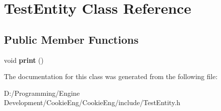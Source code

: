 \hypertarget{class_test_entity}{}\section{Test\+Entity Class Reference}
\label{class_test_entity}
\subsection*{Public Member Functions}
\begin{DoxyCompactItemize}
\item 
\mbox{\label{class_test_entity_a3b92d1c3a43cbd536b7ae817b2155c9c}} 
void {\bfseries print} ()
\end{DoxyCompactItemize}


The documentation for this class was generated from the following file\+:\begin{DoxyCompactItemize}
\item 
D\+:/\+Programming/\+Engine Development/\+Cookie\+Eng/\+Cookie\+Eng/include/Test\+Entity.\+h\end{DoxyCompactItemize}
